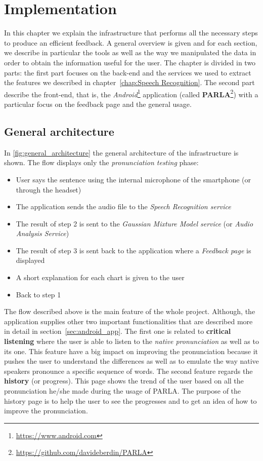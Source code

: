 \chapter{Implementation}
\label{chap:Implementation}
In this chapter we explain the infrastructure that performs all the necessary steps to produce an efficient feedback. A general overview is given and for each section, we describe in particular the tools as well as the way we manipulated the data in order to obtain the information useful for the user. The chapter is divided in two parts: the first part focuses on the back-end and the services we used to extract the features we described in chapter~\ref{chap:Speech Recognition}. The second part describe the front-end, that is, the \textit{Android}\footnote{\url{https://www.android.com}} application (called \textbf{PARLA}\footnote{\url{https://github.com/davideberdin/PARLA}}) with a particular focus on the feedback page and the general usage.

\section{General architecture}
\label{sec:general_architecture}

In \ref{fig:general_architecture} the general architecture of the infrastructure is shown.
The flow displays only the \textit{pronunciation testing} phase:

\begin{itemize}
	\item[1)] User says the sentence using the internal microphone of the smartphone (or through the headset)
	\item[2)] The application sends the audio file to the \textit{Speech Recognition service}
	\item[3)] The result of step 2 is sent to the \textit{Gaussian Mixture Model service} (or \textit{Audio Analysis Service})
	\item[4)] The result of step 3 is sent back to the application where a \textit{Feedback page} is displayed
	\item[5)] A short explanation for each chart is given to the user
	\item[6)] Back to step 1
\end{itemize}

\noindent The flow described above is the main feature of the whole project. Although, the application supplies other two important functionalities that are described more in detail in section~\ref{sec:android_app}. The first one is related to \textbf{critical listening} where the user is able to listen to the \textit{native pronunciation} as well as to its one. This feature have a big impact on improving the pronunciation because it pushes the user to understand the differences as well as to emulate the way native speakers pronounce a specific sequence of words. The second feature regards the \textbf{history} (or progress). This page shows the trend of the user based on all the pronunciation he/she made during the usage of PARLA. The purpose of the history page is to help the user to see the progresses and to get an idea of how to improve the pronunciation. \\


